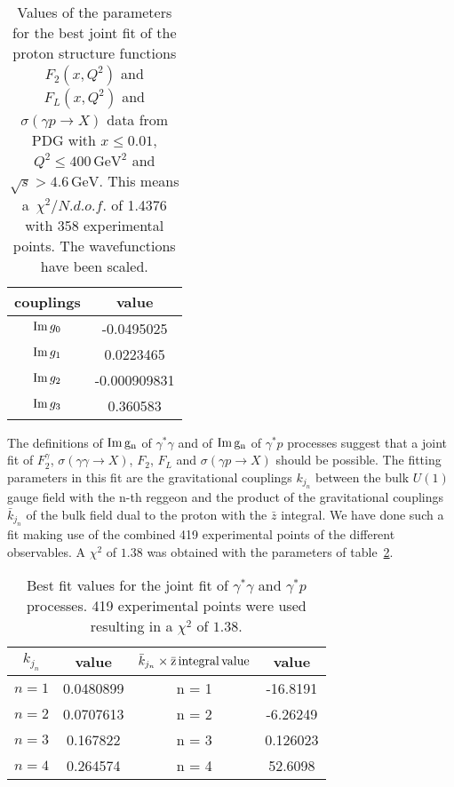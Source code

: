 \documentclass[preprint, 12pt]{elsarticle}
\begin{document}
\begin{table}[b!]
\centering
\caption{Values of the parameters for the best joint fit of the proton structure functions $F_2\left(x, Q^2\right)$ and $F_L\left(x, Q^2\right)$ and $\sigma\left(\gamma p \rightarrow X\right)$ data from PDG with $x \leq 0.01$, $Q^2 \leq 400 \, \text{GeV}^2$ and $\sqrt{s} > 4.6 \, \text{GeV}$. This means a~$\chi^2 / {N.d.o.f.}$ of 1.4376 with 358 experimental points. The wavefunctions have been scaled.}
\vspace{0.5cm}
\begin{tabular}{|c|c|}
\hline
couplings   & value \\
\hline
${\rm Im} \, g_0$  & -0.0495025\\ 
\hline
${\rm Im} \, g_1$  & 0.0223465 \\ 
\hline
${\rm Im} \, g_2$  & -0.000909831 \\
\hline
${\rm Im} \, g_3$  & 0.360583 \\ 
\hline
\end{tabular}
\label{table:GammaProton_best_joint_fit_scaled}
\end{table}

The definitions of $\rm{Im} \, g_n$ of $\gamma^* \gamma$ and of $\rm{Im} \, g_n$ of $\gamma^* p$ processes suggest that a joint fit of $F_2^\gamma$, $\sigma\left(\gamma \gamma \rightarrow X\right)$, $F_2$, $F_L$ and $\sigma\left(\gamma p \rightarrow X\right)$ should be possible. The fitting parameters in this fit are the gravitational couplings $k_{j_n}$ between the bulk $U\left(1\right)$ gauge field with the n-th reggeon and the product of the gravitational couplings $\bar{k}_{j_n}$ of the bulk field dual to the proton with the $\bar{z}$ integral.
We have done such a fit making use of the combined 419 experimental points of the different observables. A $\chi^2$ of $1.38$ was obtained with the parameters of table~\ref{table:GammaGamma_GammaProton_best_joint_fit}.
\begin{table}[b!]
\centering
\caption{Best fit values for the joint fit of $\gamma^*\gamma$ and $\gamma^*p$ processes. 419 experimental points were used resulting in a $\chi^2$ of $1.38$.}
\begin{tabular}{|c|c|c|c|}
\hline
$k_{j_n}$ & value & $\bar{k}_{j_n} \times \rm{\bar{z} \, integral \, value}$ & value \\
\hline
$n = 1$ & 0.0480899 & n = 1 & -16.8191 \\
\hline
$n = 2$ & 0.0707613 & n = 2 & -6.26249 \\
\hline
$n = 3$ & 0.167822 & n = 3 & 0.126023 \\
\hline
$n = 4$ & 0.264574 & n = 4 & 52.6098 \\
\hline
\end{tabular}
\label{table:GammaGamma_GammaProton_best_joint_fit}
\end{table}
\end{document}
